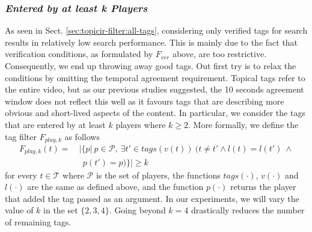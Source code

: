 \subsubsection{\textit{Entered by at least \textbf{k} Players}}
As seen in Sect. \ref{sec:topicir-filter:all-tags}, considering only verified tags for search results in relatively low search performance. This is mainly due to the fact that verification conditions, as formulated by $F_{ver}$ above, are too restrictive. Consequently, we end up throwing away good tags. Out first try is to relax the conditions by omitting the temporal agreement requirement. Topical tags refer to the entire video, but as our previous studies suggested, the 10 seconds agreement window does not reflect this well as it favours tags that are describing more obvious and short-lived aspects of the content. In particular, we consider the tags that are entered by at least $k$ players where $k\geq2$. More formally, we define the tag filter $F_{play,k}$ as follows
\begin{align}
F_{play,k}(t) = &~|\{p|~p \in \mathcal{P},~\exists t' \in tags(v(t))~(t\neq t' \wedge l(t) = l(t')~\wedge \nonumber\\
			  & ~~~ p(t') = p)\}| \geq k 
\end{align}
for every $t \in \mathcal{T}$ where $\mathcal{P}$ is the set of players, the functions $tags(\cdot)$, $v(\cdot)$ and $l(\cdot)$ are the same as defined above, and the function $p(\cdot)$ returns the player that added the tag passed as an argument. In our experiments, we will vary the value of $k$ in the set $\{2,3,4\}$. Going beyond $k=4$ drastically reduces the number of remaining tags.

